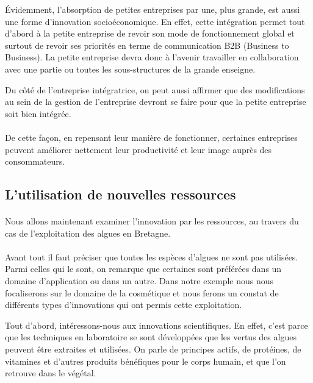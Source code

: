 \documentclass[a4paper,12pt]{report}
\begin{document}
			Évidemment, l’absorption de petites entreprises par une, plus grande, est aussi une forme d’innovation socioéconomique. En effet, cette intégration permet tout d’abord à la petite entreprise de revoir son mode de fonctionnement global et surtout de revoir ses priorités en terme de communication B2B (Business to Business). La petite entreprise devra donc à l’avenir travailler en collaboration avec une partie ou toutes les sous-structures de la grande enseigne.

			Du côté de l’entreprise intégratrice, on peut aussi affirmer que des modifications au sein de la gestion de l’entreprise devront se faire pour que la petite entreprise soit bien intégrée. 
			
			\paragraph{}De cette façon, en repensant leur manière de fonctionner, certaines entreprises peuvent améliorer nettement leur productivité et leur image auprès des consommateurs.
			
			
				
		\subsection{L'utilisation de nouvelles ressources}
			\paragraph{}Nous allons maintenant examiner l'innovation par les ressources, au travers du cas de l’exploitation des algues en Bretagne.

			\paragraph{}Avant tout il faut préciser que toutes les espèces d’algues ne sont pas utilisées. Parmi celles qui le sont, on remarque que certaines sont préférées dans un domaine d’application ou dans un autre. Dans notre exemple nous nous focaliserons sur le domaine de la cosmétique et nous ferons un constat de différents types d’innovations qui ont permis cette exploitation.
			
			Tout d’abord, intéressons-nous aux innovations scientifiques. En effet, c’est parce que les techniques en laboratoire se sont développées que les vertus des algues peuvent être extraites et utilisées. On parle de principes actifs, de protéines, de vitamines et d’autres produits bénéfiques pour le corps humain, et que l’on retrouve dans le végétal.
			
\end{document}
